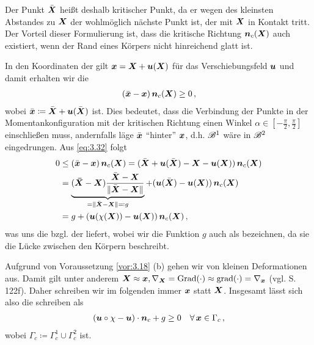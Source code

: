 \begin{bem}\label{bem:3.19}
Der Punkt $\bar{\boldsymbol X}$ heißt deshalb kritischer Punkt, da er wegen des kleinsten Abstandes zu $\boldsymbol X$ der wohlmöglich nächste Punkt ist, der mit $\boldsymbol X$ in Kontakt tritt. Der Vorteil dieser Formulierung ist, dass die kritische Richtung $\boldsymbol n_c(\boldsymbol X)$ auch existiert, wenn der Rand eines Körpers nicht hinreichend glatt ist.
\end{bem}


In den Koordinaten der  gilt $\boldsymbol x = \boldsymbol X + \boldsymbol u(\boldsymbol X)$ für das Verschiebungsfeld $\boldsymbol u$ und damit erhalten wir die \textit{}
\begin{align}\label{eq:3.32}
	(\bar{\boldsymbol x} - \boldsymbol x) \, \boldsymbol n_c (\boldsymbol X) \ge 0 \, , 
\end{align}
wobei $\bar{\boldsymbol x} \coloneqq \bar{\boldsymbol X} +\boldsymbol u(\bar{\boldsymbol X})$ ist. Dies bedeutet, dass die Verbindung der Punkte in der Momentankonfiguration mit der kritischen Richtung einen Winkel $\alpha \in [-\frac \pi2,\frac \pi2]$ einschließen muss, andernfalls läge $\bar{\boldsymbol x}$ "`hinter"' $\boldsymbol x$, d.h. $\mathscr B^1$ wäre in $\mathscr B^2$ eingedrungen. Aus \eqref{eq:3.32} folgt
\begin{align*}
	0 &  \le (\bar{\boldsymbol x} - \boldsymbol x) \, \boldsymbol n_c (\boldsymbol X) = (\bar{\boldsymbol X} + \boldsymbol u(\bar{\boldsymbol X}) -{\boldsymbol X} - \boldsymbol u({\boldsymbol X})) \, \boldsymbol n_c(\boldsymbol X) \\
	& = \underbrace{(\boldsymbol{\bar X} - \boldsymbol X) \frac{\bar{\boldsymbol X}-\boldsymbol X}{\lVert \bar{\boldsymbol X}-\boldsymbol X\rVert}}_{ = \lVert \bar{\boldsymbol X}-\boldsymbol X\rVert\eqqcolon g} + (\boldsymbol u(\bar{\boldsymbol X})  -\boldsymbol u({\boldsymbol X})) \, \boldsymbol n_c(\boldsymbol X) \\
	& = g + (\boldsymbol  u(\chi(\boldsymbol X))  -\boldsymbol u({\boldsymbol X})) \, \boldsymbol n_c(\boldsymbol X) \, ,
\end{align*}
was uns die  bzgl. der  liefert, wobei wir die Funktion $g$ auch als \textit{} bezeichnen, da sie die Lücke zwischen den Körpern beschreibt.

Aufgrund von Voraussetzung \ref{vor:3.18} (b) gehen wir von kleinen Deformationen aus. Damit gilt unter anderem  $\boldsymbol X \approx \boldsymbol x,  \nabla_{\boldsymbol X} =\operatorname{Grad}(\cdot)\approx \operatorname{grad}(\cdot) =  \nabla_{\boldsymbol x}$ (vgl. \cite{AltKonti} S. 122f). Daher schreiben wir im folgenden immer $\boldsymbol x$ statt $\boldsymbol X$. Insgesamt lässt sich also die  schreiben als
\begin{align}\label{eq:3.33}
	(\boldsymbol u \circ \chi -\boldsymbol u) \cdot \boldsymbol n_c + g \ge 0 \quad \forall \, \boldsymbol x \in \Gamma_c \, ,
\end{align}
wobei $\Gamma_c \coloneqq \Gamma_c^1 \cup \Gamma_c^2$ ist.



